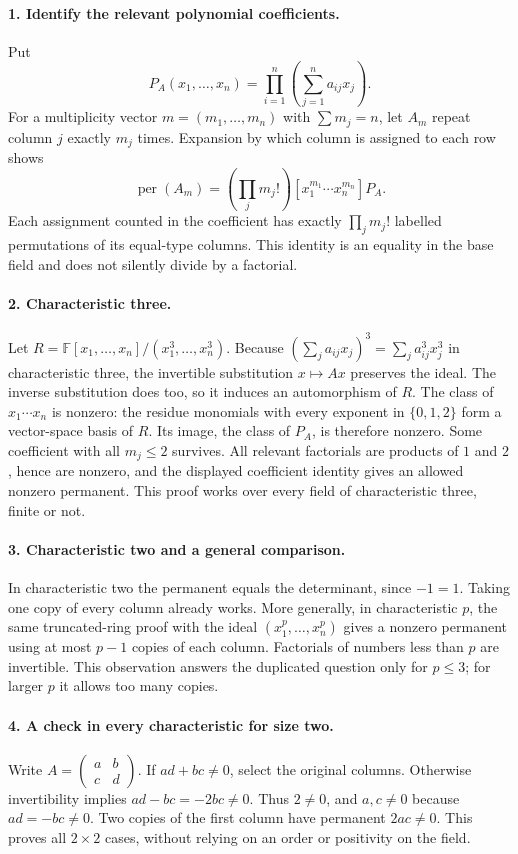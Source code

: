 \documentclass[11pt,a4paper]{article}
\begin{document}
\paragraph{1. Identify the relevant polynomial coefficients.}
Put
\[
 P_A(x_1,\ldots,x_n)=\prod_{i=1}^n\left(\sum_{j=1}^n a_{ij}x_j\right).
\]
For a multiplicity vector $m=(m_1,\ldots,m_n)$ with $\sum m_j=n$,
let $A_m$ repeat column $j$ exactly $m_j$ times. Expansion by which
column is assigned to each row shows
\[
 \operatorname{per}(A_m)=
 \left(\prod_j m_j!\right)[x_1^{m_1}\cdots x_n^{m_n}]P_A.
\]
Each assignment counted in the coefficient has exactly
$\prod_jm_j!$ labelled permutations of its equal-type columns. This
identity is an equality in the base field and does not silently divide
by a factorial.

\paragraph{2. Characteristic three.}
Let $R=\mathbb F[x_1,\ldots,x_n]/(x_1^3,\ldots,x_n^3)$.
Because $(\sum_j a_{ij}x_j)^3=\sum_j a_{ij}^3x_j^3$ in
characteristic three, the invertible substitution $x\mapsto Ax$
preserves the ideal. The inverse substitution does too, so it induces
an automorphism of $R$. The class of $x_1\cdots x_n$ is nonzero:
the residue monomials with every exponent in $\{0,1,2\}$ form a
vector-space basis of $R$. Its image, the class of $P_A$, is therefore
nonzero. Some coefficient with all $m_j\le2$ survives. All relevant
factorials are products of $1$ and $2$, hence are nonzero, and the
displayed coefficient identity gives an allowed nonzero permanent.
This proof works over every field of characteristic three, finite or not.

\paragraph{3. Characteristic two and a general comparison.}
In characteristic two the permanent equals the determinant, since
$-1=1$. Taking one copy of every column already works. More generally,
in characteristic $p$, the same truncated-ring proof with the ideal
$(x_1^p,\ldots,x_n^p)$ gives a nonzero permanent using at most $p-1$
copies of each column. Factorials of numbers less than $p$ are invertible.
This observation answers the duplicated question only for $p\le3$;
for larger $p$ it allows too many copies.

\paragraph{4. A check in every characteristic for size two.}
Write $A=\left(\begin{smallmatrix}a&b\\c&d\end{smallmatrix}\right)$.
If $ad+bc\ne0$, select the original columns. Otherwise invertibility
implies $ad-bc=-2bc\ne0$. Thus $2\ne0$, and $a,c\ne0$ because
$ad=-bc\ne0$. Two copies of the first column have permanent
$2ac\ne0$. This proves all $2\times2$ cases, without relying on
an order or positivity on the field.
\end{document}
